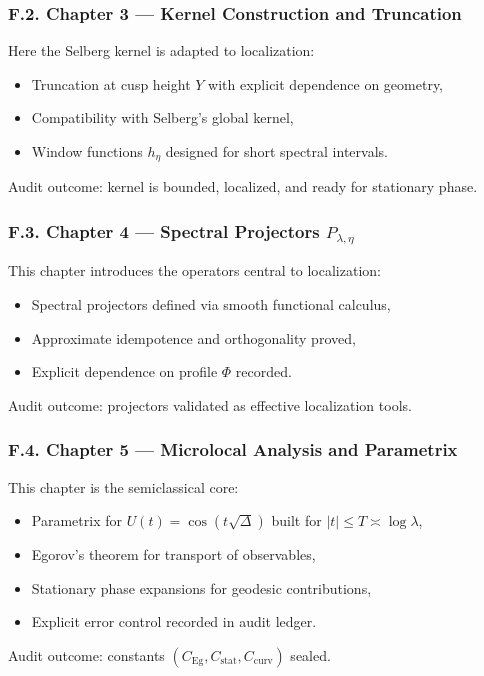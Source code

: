 \subsubsection*{F.2. Chapter 3 — Kernel Construction and Truncation}
Here the Selberg kernel is adapted to localization:
\begin{itemize}
  \item Truncation at cusp height $Y$ with explicit dependence on geometry,
  \item Compatibility with Selberg’s global kernel,
  \item Window functions $h_\eta$ designed for short spectral intervals.
\end{itemize}
Audit outcome: kernel is bounded, localized, and ready for stationary phase.

\subsubsection*{F.3. Chapter 4 — Spectral Projectors $P_{\lambda,\eta}$}
This chapter introduces the operators central to localization:
\begin{itemize}
  \item Spectral projectors defined via smooth functional calculus,
  \item Approximate idempotence and orthogonality proved,
  \item Explicit dependence on profile $\Phi$ recorded.
\end{itemize}
Audit outcome: projectors validated as effective localization tools.

\subsubsection*{F.4. Chapter 5 — Microlocal Analysis and Parametrix}
This chapter is the semiclassical core:
\begin{itemize}
  \item Parametrix for $U(t)=\cos(t\sqrt{\Delta})$ built for $|t|\le T\asymp \log \lambda$,
  \item Egorov’s theorem for transport of observables,
  \item Stationary phase expansions for geodesic contributions,
  \item Explicit error control recorded in audit ledger.
\end{itemize}
Audit outcome: constants $(C_{\mathrm{Eg}}, C_{\mathrm{stat}}, C_{\mathrm{curv}})$ sealed.

